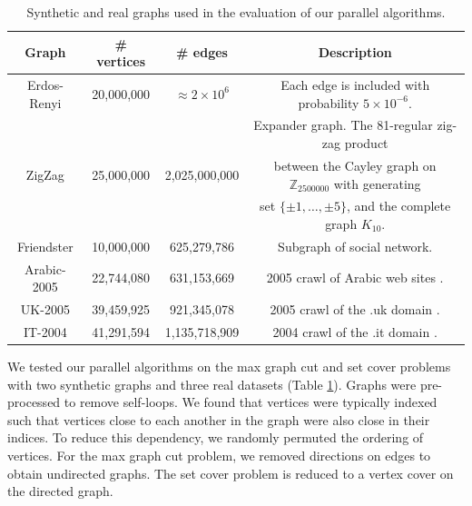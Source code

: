 \documentclass{article} %
\begin{document}
\begin{table}[h]
\centering\footnotesize
\begin{tabular}{|c|c|c|c|}\hline
Graph & \# vertices & \# edges & Description \\\hline\hline
Erdos-Renyi & 20,000,000 & $\approx 2 \times 10^6$ & Each edge is included with probability $5\times 10^{-6}$.\\\hline
\multirow{3}{*}{ZigZag}      & \multirow{3}{*}{25,000,000} &  \multirow{3}{*}{2,025,000,000} & Expander graph. The 81-regular zig-zag product \\
& & & between the Cayley graph on $\mathbb{Z}_{2500000}$ with generating \\
& & & set $\{\pm 1,\dots,\pm 5\}$, and the complete graph $K_{10}$.\\\hline
Friendster  & 10,000,000 &    625,279,786 & Subgraph of social network. \cite{snap}\\\hline
Arabic-2005 & 22,744,080 &    631,153,669 & 2005 crawl of Arabic web sites \cite{BoVWFI, BRSLLP, BCSU3}. \\\hline
UK-2005     & 39,459,925 &    921,345,078 & 2005 crawl of the .uk domain \cite{BoVWFI, BRSLLP, BCSU3}. \\\hline
IT-2004     & 41,291,594 &  1,135,718,909 & 2004 crawl of the .it domain \cite{BoVWFI, BRSLLP, BCSU3}. \\\hline
\end{tabular}
\caption{\footnotesize Synthetic and real graphs used in the evaluation of our parallel algorithms.}
\label{tab:graphstats}
\end{table}



We tested our parallel algorithms on the max graph cut and set cover problems with two synthetic graphs and three real datasets (Table \ref{tab:graphstats}).
Graphs were pre-processed to remove self-loops.
We found that vertices were typically indexed such that vertices close to each another in the graph were also close in their indices.
To reduce this dependency, we randomly permuted the ordering of vertices.
For the max graph cut problem, we removed directions on edges to obtain undirected graphs.
The set cover problem is reduced to a vertex cover on the directed graph.
\end{document}
